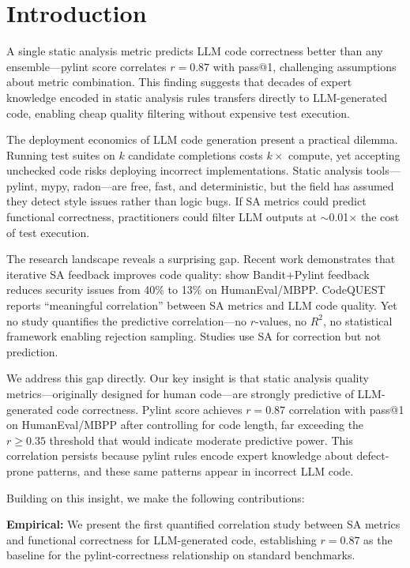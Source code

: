 \section{Introduction}
\label{sec:introduction}

A single static analysis metric predicts LLM code correctness better than any ensemble---pylint score correlates $r=0.87$ with pass@1, challenging assumptions about metric combination. This finding suggests that decades of expert knowledge encoded in static analysis rules transfers directly to LLM-generated code, enabling cheap quality filtering without expensive test execution.

The deployment economics of LLM code generation present a practical dilemma. Running test suites on $k$ candidate completions costs $k\times$ compute, yet accepting unchecked code risks deploying incorrect implementations. Static analysis tools---pylint, mypy, radon---are free, fast, and deterministic, but the field has assumed they detect style issues rather than logic bugs. If SA metrics could predict functional correctness, practitioners could filter LLM outputs at $\sim$0.01$\times$ the cost of test execution.

The research landscape reveals a surprising gap. Recent work demonstrates that iterative SA feedback improves code quality: \citet{Blyth2025Static} show Bandit+Pylint feedback reduces security issues from 40\% to 13\% on HumanEval/MBPP. CodeQUEST~\citep{Liu2025CodeQUEST} reports ``meaningful correlation'' between SA metrics and LLM code quality. Yet no study quantifies the predictive correlation---no $r$-values, no $R^2$, no statistical framework enabling rejection sampling. Studies use SA for correction but not prediction.

We address this gap directly. Our key insight is that static analysis quality metrics---originally designed for human code---are strongly predictive of LLM-generated code correctness. Pylint score achieves $r=0.87$ correlation with pass@1 on HumanEval/MBPP after controlling for code length, far exceeding the $r\geq0.35$ threshold that would indicate moderate predictive power. This correlation persists because pylint rules encode expert knowledge about defect-prone patterns, and these same patterns appear in incorrect LLM code.

Building on this insight, we make the following contributions:

\textbf{Empirical:} We present the first quantified correlation study between SA metrics and functional correctness for LLM-generated code, establishing $r=0.87$ as the baseline for the pylint-correctness relationship on standard benchmarks.

